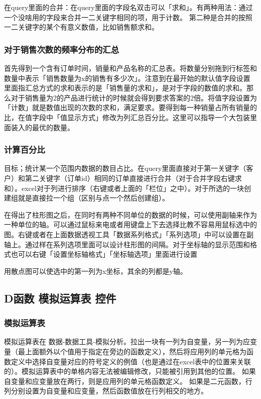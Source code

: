 \documentclass[10pt, a4paper]{article}
\begin{document}
            在query里面的合并：在query里面的字段名双击可以「求和」。有两种用法：通过一个没啥用的字段来合并一二关键字相同的项，用于计数。 第二种是合并的按照一二关键字的某个有意义数值，比如销售额求和。
            \subsubsection{对于销售次数的频率分布的汇总}
            首先得到一个含有订单时间，销量和产品名称的汇总表。将数量分别拖到行标签和数量中表示「销售数量为x的销售有多少次」。注意到在最开始的默认值字段设置里面指汇总方式的求和表示的是「销售量的求和」，是对于字段的数值的求和。那么对于销售量为2的产品进行统计的时候就会得到要求答案的2倍。将值字段设置为「计数」就是数值出现的次数的求和，满足要求。要得到每一种销量占所有销量的比，在值字段中「值显示方式」修改为列汇总百分比。这里可以指导一个大包装里面装入的最优的数量。
            \subsubsection{计算百分比}
            目标；统计某一个范围内数据的数目占比。在query里面直接对于第一关键字（客户）和第二关键字（订单id）相同的订单直接进行合并（对于合并字段右键求和）。excel对于列进行排序（右键或者上面的「栏位」之中）。对于所选的一块创建组就是直接拉一个组（区别与点一个然后创建组）。

            在得出了柱形图之后，在同时有两种不同单位的数据的时候，可以使用副轴来作为一种单位的轴。可以通过鼠标来电或者用键盘上下去选择比教不容易用鼠标选中的图。右键或者在上面数据透视工具「数据系列格式」「系列选项」中可以设置在副轴上。通过样在系列选项里面可以设计柱形图的间隔。对于坐标轴的显示范围和格式也可以右键「设置坐标轴格式」「坐标轴选项」里面进行设置

            用散点图可以使选中的第一列为x坐标，其余的列都是y轴。
        \subsection{D函数 模拟运算表 控件}
            \subsubsection{模拟运算表}
                模拟运算表在 数据-数据工具-模拟分析。拉出一块有一列为自变量，另一列为应变量（最上面额外以个值用于指定在旁边的函数定义），然后将应用列的单元格为函数定义中选择自变量对应的符号定义的例值（也是通过在excel表中的位置来关联的）。模拟运算表中的单格内容无法被编辑修改，只能被引用到其他的位置。 如果自变量和应变量放在两行，则是应用列的单元格函数定义。 如果是二元函数，行列分别设置为自变量和应变量，然后函数值放在行列相交的地方。
\end{document}
